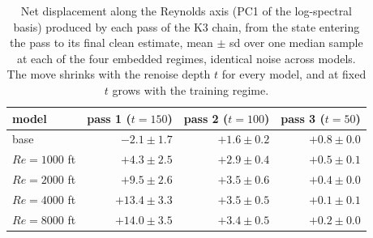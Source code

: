 \begin{table}[t]
  \centering
  \caption{Net displacement along the Reynolds axis (PC1 of the log-spectral basis) produced by each pass of the K3 chain, from the state entering the pass to its final clean estimate, mean $\pm$ sd over one median sample at each of the four embedded regimes, identical noise across models. The move shrinks with the renoise depth $t$ for every model, and at fixed $t$ grows with the training regime.}
  \label{tab:manifold-pass-distances}
  \begin{tabular}{lrrr}
    \toprule
    model & pass 1 ($t{=}150$) & pass 2 ($t{=}100$) & pass 3 ($t{=}50$) \\
    \midrule
    base & $-2.1 \pm 1.7$ & $+1.6 \pm 0.2$ & $+0.8 \pm 0.0$ \\
    $Re{=}1000$ ft & $+4.3 \pm 2.5$ & $+2.9 \pm 0.4$ & $+0.5 \pm 0.1$ \\
    $Re{=}2000$ ft & $+9.5 \pm 2.6$ & $+3.5 \pm 0.6$ & $+0.4 \pm 0.0$ \\
    $Re{=}4000$ ft & $+13.4 \pm 3.3$ & $+3.5 \pm 0.5$ & $+0.1 \pm 0.1$ \\
    $Re{=}8000$ ft & $+14.0 \pm 3.5$ & $+3.4 \pm 0.5$ & $+0.2 \pm 0.0$ \\
    \bottomrule
  \end{tabular}
\end{table}
